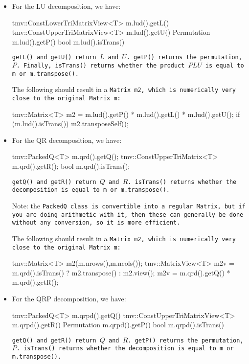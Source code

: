 \begin{itemize}
\item
For the LU decomposition, we have:
\begin{tmvcode}
tmv::ConstLowerTriMatrixView<T> m.lud().getL()
tmv::ConstUpperTriMatrixView<T> m.lud().getU()
Permutation m.lud().getP()
bool m.lud().isTrans()
\end{tmvcode}
\tt{getL()} and \tt{getU()} return $L$ and $U$.
\tt{getP()} returns the permutation, $P$.
Finally, \tt{isTrans()} returns whether
the product $PLU$ is equal to \tt{m} or \tt{m.transpose()}.  

The following should result in a \tt{Matrix m2}, which is numerically very close to
the original \tt{Matrix m}:
\begin{tmvcode}
tmv::Matrix<T> m2 = m.lud().getP() * m.lud().getL() * m.lud().getU();
if (m.lud().isTrans()) m2.transposeSelf();
\end{tmvcode}

\item
For the QR decomposition, we have:
\begin{tmvcode}
tmv::PackedQ<T> m.qrd().getQ();
tmv::ConstUpperTriMatrix<T> m.qrd().getR();
bool m.qrd().isTrans();
\end{tmvcode}
\tt{getQ()} and \tt{getR()} return $Q$ and $R$.  
\tt{isTrans()} returns whether
the decomposition is equal to \tt{m} or \tt{m.transpose()}.  

Note: the \tt{PackedQ} class is convertible into a regular \tt{Matrix}, but if you are doing 
arithmetic with it, then these can generally be done without any conversion,
so it is more efficient.

The following should result in a \tt{Matrix m2}, which is numerically very close to
the original \tt{Matrix m}:
\begin{tmvcode}
tmv::Matrix<T> m2(m.nrows(),m.ncols());
tmv::MatrixView<T> m2v = 
      m.qrd().isTrans() ? m2.transpose() : m2.view();
m2v = m.qrd().getQ() * m.qrd().getR();
\end{tmvcode}

\item
For the QRP decomposition, we have:
\begin{tmvcode}
tmv::PackedQ<T> m.qrpd().getQ()
tmv::ConstUpperTriMatrixView<T> m.qrpd().getR()
Permutation m.qrpd().getP()
bool m.qrpd().isTrans()
\end{tmvcode}
\tt{getQ()} and \tt{getR()} return $Q$ and $R$.
\tt{getP()} returns the permutation, $P$.
\tt{isTrans()} returns whether
the decomposition is equal to \tt{m} or \tt{m.transpose()}.  


\end{itemize}
